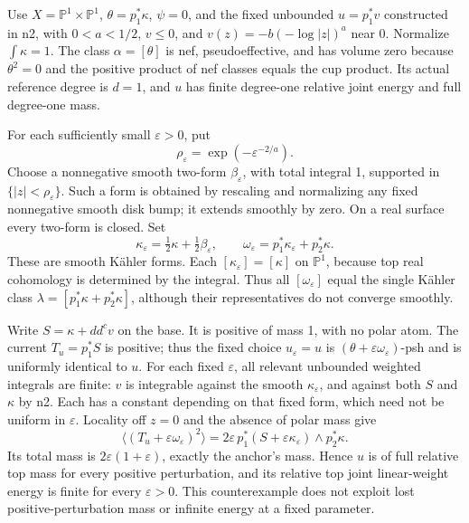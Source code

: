 \documentclass[
  11pt,
]{article}
\begin{document}
Use \(X=\mathbb P^1\times\mathbb P^1\), \(\theta=p_1^*\kappa\),
\(\psi=0\), and the fixed unbounded \(u=p_1^*v\) constructed in n2, with
\(0<a<1/2\), \(v\leq0\), and \(v(z)=-b(-\log|z|)^a\) near \(0\).
Normalize \(\int\kappa=1\). The class \(\alpha=[\theta]\) is nef,
pseudoeffective, and has volume zero because \(\theta^2=0\) and the
positive product of nef classes equals the cup product. Its actual
reference degree is \(d=1\), and \(u\) has finite degree-one relative
joint energy and full degree-one mass.

For each sufficiently small \(\varepsilon>0\), put \[
\rho_\varepsilon=\exp(-\varepsilon^{-2/a}).
\] Choose a nonnegative smooth two-form \(\beta_\varepsilon\), with
total integral 1, supported in \(\{|z|<\rho_\varepsilon\}\). Such a form
is obtained by rescaling and normalizing any fixed nonnegative smooth
disk bump; it extends smoothly by zero. On a real surface every two-form
is closed. Set \[
\kappa_\varepsilon=\tfrac12\kappa+\tfrac12\beta_\varepsilon,
\qquad
\omega_\varepsilon=p_1^*\kappa_\varepsilon+p_2^*\kappa.
\tag{23a}
\] These are smooth Kähler forms. Each \([\kappa_\varepsilon]=[\kappa]\)
on \(\mathbb P^1\), because top real cohomology is determined by the
integral. Thus all \([\omega_\varepsilon]\) equal the single Kähler
class \(\lambda=[p_1^*\kappa+p_2^*\kappa]\), although their
representatives do not converge smoothly.

Write \(S=\kappa+dd^cv\) on the base. It is positive of mass 1, with no
polar atom. The current \(T_u=p_1^*S\) is positive; thus the fixed
choice \(u_\varepsilon=u\) is
\((\theta+\varepsilon\omega_\varepsilon)\)-psh and is uniformly
identical to \(u\). For each fixed \(\varepsilon\), all relevant
unbounded weighted integrals are finite: \(v\) is integrable against the
smooth \(\kappa_\varepsilon\), and against both \(S\) and \(\kappa\) by
n2. Each has a constant depending on that fixed form, which need not be
uniform in \(\varepsilon\). Locality off \(z=0\) and the absence of
polar mass give \[
\langle(T_u+\varepsilon\omega_\varepsilon)^2\rangle
=2\varepsilon\,p_1^*(S+\varepsilon\kappa_\varepsilon)\wedge p_2^*\kappa.
\] Its total mass is \(2\varepsilon(1+\varepsilon)\), exactly the
anchor's mass. Hence \(u\) is of full relative top mass for every
positive perturbation, and its relative top joint linear-weight energy
is finite for every \(\varepsilon>0\). This counterexample does not
exploit lost positive-perturbation mass or infinite energy at a fixed
parameter.
\end{document}
